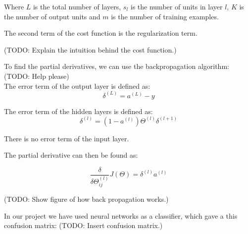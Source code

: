 Where $L$ is the total number of layers, $s_l$ is the number of units in layer $l$, $K$ is the number of output units and $m$ is the number of training examples.

The second term of the cost function is the regularization term.

(TODO: Explain the intuition behind the cost function.)

To find the partial derivatives, we can use the backpropagation algorithm: (TODO: Help please)\\

The error term of the output layer is defined as:
\begin{equation}
\delta^{(L)} = a^{(L)}-y
\end{equation}

The error term of the hidden layers is defined as:
\begin{equation}
\delta^{(l)} = (1-a^{(l)})\Theta^{(l)}\delta^{(l+1)}
\end{equation}

There is no error term of the input layer. 

The partial derivative can then be found as:

\begin{equation}
\frac{\delta}{\delta\Theta^{(l)}_{ij}}J(\Theta) = 
\delta^{(l)}a^{(l)}
\end{equation}

(TODO: Show figure of how back propagation works.)

In our project we have used neural networks as a classifier, which gave a this confusion matrix:
(TODO: Insert confusion matrix.)
